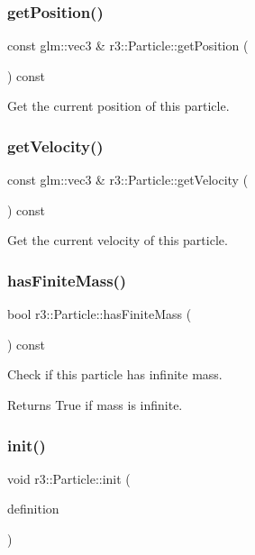 \subsubsection{\texorpdfstring{get\+Position()}{getPosition()}}
{\footnotesize\ttfamily const glm\+::vec3 \& r3\+::\+Particle\+::get\+Position (\begin{DoxyParamCaption}{ }\end{DoxyParamCaption}) const}

Get the current position of this particle. \mbox{\label{classr3_1_1_particle_ad62513767465d21c328b4296aa9720ff}} 
\subsubsection{\texorpdfstring{get\+Velocity()}{getVelocity()}}
{\footnotesize\ttfamily const glm\+::vec3 \& r3\+::\+Particle\+::get\+Velocity (\begin{DoxyParamCaption}{ }\end{DoxyParamCaption}) const}

Get the current velocity of this particle. \mbox{\label{classr3_1_1_particle_a7517367ac5587d97d783429585ec0e90}} 
\subsubsection{\texorpdfstring{has\+Finite\+Mass()}{hasFiniteMass()}}
{\footnotesize\ttfamily bool r3\+::\+Particle\+::has\+Finite\+Mass (\begin{DoxyParamCaption}{ }\end{DoxyParamCaption}) const}

Check if this particle has infinite mass. \begin{DoxyReturn}{Returns}
True if mass is infinite. 
\end{DoxyReturn}
\mbox{\label{classr3_1_1_particle_a660673cfa03f0195560df72c659b22a5}} 
\subsubsection{\texorpdfstring{init()}{init()}}
{\footnotesize\ttfamily void r3\+::\+Particle\+::init (\begin{DoxyParamCaption}\item[{const \mbox{\hyperlink{structr3_1_1_particle_def}{Particle\+Def}} \&}]{definition }\end{DoxyParamCaption})}

